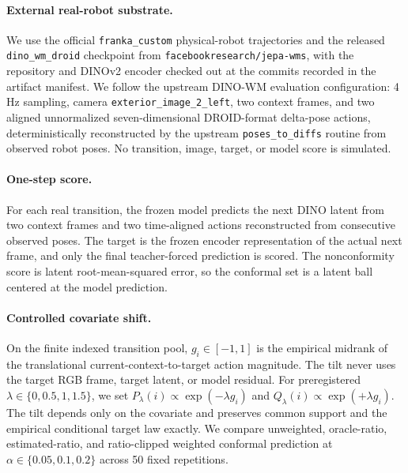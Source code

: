\paragraph{External real-robot substrate.}
We use the official \texttt{franka\_custom} physical-robot trajectories and the released
\texttt{dino\_wm\_droid} checkpoint from \texttt{facebookresearch/jepa-wms}, with the repository
and DINOv2 encoder checked out at the commits recorded in the artifact manifest. We follow the
upstream DINO-WM evaluation configuration: 4 Hz sampling, camera
\texttt{exterior\_image\_2\_left}, two context frames, and two aligned unnormalized
seven-dimensional DROID-format delta-pose actions, deterministically reconstructed by the upstream
\texttt{poses\_to\_diffs} routine from observed robot poses. No transition, image, target, or
model score is simulated.

\paragraph{One-step score.}
For each real transition, the frozen model predicts the next DINO latent from two context frames
and two time-aligned actions reconstructed from consecutive observed poses. The target is the
frozen encoder representation of the actual next frame, and only the final teacher-forced
prediction is scored.
The nonconformity score is latent root-mean-squared error, so the conformal set is a latent ball
centered at the model prediction.

\paragraph{Controlled covariate shift.}
On the finite indexed transition pool, $g_i\in[-1,1]$ is the empirical midrank of the translational
current-context-to-target action magnitude. The tilt never uses the target RGB frame, target latent, or model
residual. For preregistered $\lambda\in\{0,0.5,1,1.5\}$, we set
$P_\lambda(i)\propto\exp(-\lambda g_i)$ and
$Q_\lambda(i)\propto\exp(+\lambda g_i)$. The tilt depends only on the covariate and preserves
common support and the empirical conditional target law exactly. We compare unweighted,
oracle-ratio, estimated-ratio, and ratio-clipped weighted conformal prediction at
$\alpha\in\{0.05,0.1,0.2\}$ across 50 fixed repetitions.
